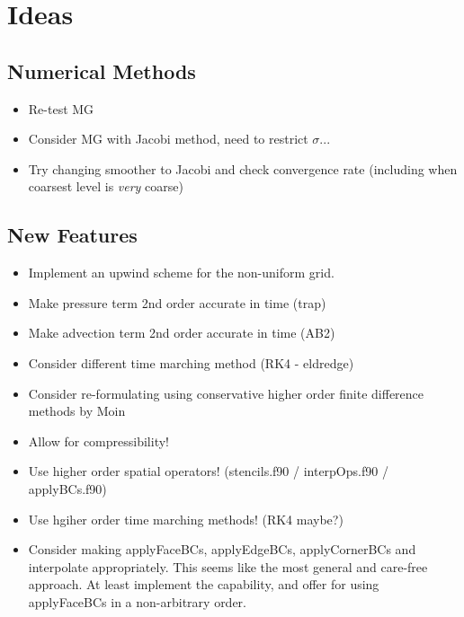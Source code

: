 \documentclass[11pt]{article}
\begin{document}
\section{Ideas}

\subsection{Numerical Methods}
\begin{itemize}
\setlength\itemsep{-1em}
\item Re-test MG
\item Consider MG with Jacobi method, need to restrict $\sigma$...
\item Try changing smoother to Jacobi and check convergence rate (including when coarsest level is \textit{very} coarse)
\end{itemize}

\subsection{New Features}
\begin{itemize}
\setlength\itemsep{-1em}
\item Implement an upwind scheme for the non-uniform grid.
\item Make pressure term 2nd order accurate in time (trap)
\item Make advection term 2nd order accurate in time (AB2)
\item Consider different time marching method (RK4 - eldredge)
\item Consider re-formulating using conservative higher order finite difference methods by Moin
\item Allow for compressibility!
\item Use higher order spatial operators! (stencils.f90 / interpOps.f90 / applyBCs.f90)
\item Use hgiher order time marching methods! (RK4 maybe?)
\item Consider making applyFaceBCs, applyEdgeBCs, applyCornerBCs and interpolate appropriately. This seems like the most general and care-free approach. At least implement the capability, and offer for using applyFaceBCs in a non-arbitrary order.
\end{itemize}
\end{document}
